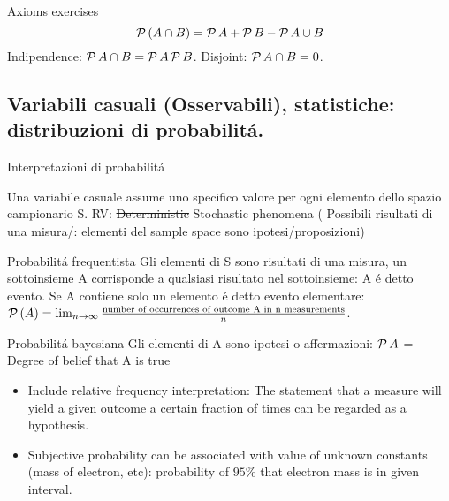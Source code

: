 \begin{wordonframe}{Axioms exercises}
\[\operatorname{\mathcal{P}}{(A\cap B)}=\operatorname{\mathcal{P}}{A}+\operatorname{\mathcal{P}}{B}-\operatorname{\mathcal{P}}{A\cup B}\]
Indipendence: $\operatorname{\mathcal{P}}{A\cap B}=\operatorname{\mathcal{P}}{A}\operatorname{\mathcal{P}}{B}$.
Disjoint: $\operatorname{\mathcal{P}}{A\cap B}=0$.
\end{wordonframe}

\subsection{Variabili casuali (Osservabili), statistiche: distribuzioni di probabilit\'a.}

\begin{frame}{Interpretazioni di probabilit\'a}
\begin{block}{Una variabile casuale assume uno specifico valore per ogni elemento dello spazio campionario S.}
RV: \sout{Deterministic} Stochastic phenomena ( Possibili risultati di una misura/: elementi del sample space sono ipotesi/proposizioni)
\end{block}
\begin{block}{Probabilit\'a frequentista}
Gli elementi di S sono risultati di una misura, un sottoinsieme A corrisponde a qualsiasi risultato nel sottoinsieme: A \'e detto evento. Se A contiene solo un elemento \'e detto evento elementare: $\operatorname{\mathcal{P}}{(A)}=\lim_{n\to\infty}\frac{\text{number of occurrences of outcome A in n measurements}}{n}$.
\end{block}
\begin{block}{Probabilit\'a bayesiana}
Gli elementi di A sono ipotesi o affermazioni: $\operatorname{\mathcal{P}}{A}$ = Degree of belief that A is true
\begin{itemize}
\item Include relative frequency interpretation: The statement that a measure will yield a given outcome a certain fraction of times can be regarded as a hypothesis.
\item Subjective probability can be associated with value of unknown constants (mass of electron, etc): probability of $95\%$ that electron mass is in given interval.
\end{itemize}
\end{block}
\end{frame}

